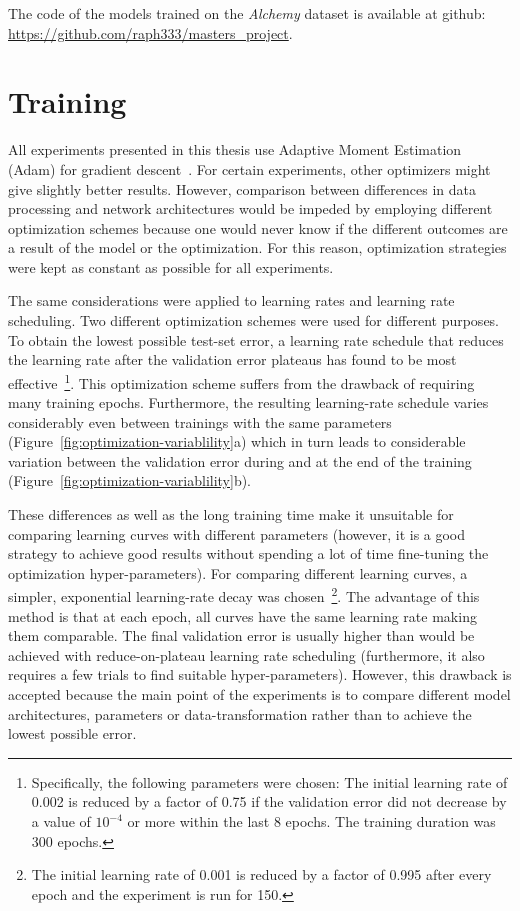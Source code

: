 The code of the models trained on the \textit{Alchemy} dataset is available at github: \url{https://github.com/raph333/masters\_project}.



\section{Training}
\label{sec:training}

All experiments presented in this thesis use Adaptive Moment Estimation (Adam) for gradient descent~\cite{Kingma2015}. For certain experiments, other optimizers might give slightly better results. However, comparison between differences in data processing and network architectures would be impeded by employing different optimization schemes because one would never know if the different outcomes are a result of the model or the optimization. For this reason, optimization strategies were kept as constant as possible for all experiments.

The same considerations were applied to learning rates and learning rate scheduling. Two different optimization schemes were used for different purposes.
To obtain the lowest possible test-set error, a learning rate schedule that reduces the learning rate after the validation error plateaus has found to be most effective~\footnote{\label{fn:reduce-on-plateu}
	Specifically, the following parameters were chosen: The initial learning rate of 0.002 is reduced by a factor of 0.75 if the validation error did not decrease by a value of $10^{-4}$ or more within the last 8 epochs. The training duration was 300 epochs.
}. This optimization scheme suffers from the drawback of requiring many training epochs. Furthermore, the resulting learning-rate schedule varies considerably even between trainings with the same parameters (Figure~\ref{fig:optimization-variablility}a) which in turn leads to considerable variation between the validation error during and at the end of the training (Figure~\ref{fig:optimization-variablility}b).

These differences as well as the long training time make it unsuitable for comparing learning curves with different parameters (however, it is a good strategy to achieve good results without spending a lot of time fine-tuning the optimization hyper-parameters).
For comparing different learning curves, a simpler, exponential learning-rate decay was chosen~\footnote{The initial learning rate of 0.001 is reduced by a factor of 0.995 after every epoch and the experiment is run for 150.}. The advantage of this method is that at each epoch, all curves have the same learning rate making them comparable. The final validation error is usually higher than would be achieved with reduce-on-plateau learning rate scheduling (furthermore, it also requires a few trials to find suitable hyper-parameters). However, this drawback is accepted because the main point of the experiments is to compare different model architectures, parameters or data-transformation rather than to achieve the lowest possible error.

